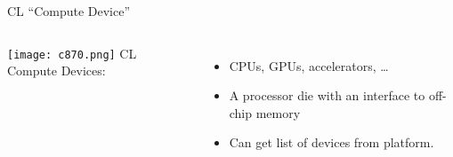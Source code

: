 \begin{frame}{CL ``Compute Device''}
  \begin{columns}
      \texttt{[image: c870.png]}
      CL Compute Devices:
      \begin{itemize}
        \item CPUs, GPUs, accelerators, \dots
        \item A processor die with an interface to off-chip memory
        \item Can get list of devices from platform.
      \end{itemize}
  \end{columns}
\end{frame}
